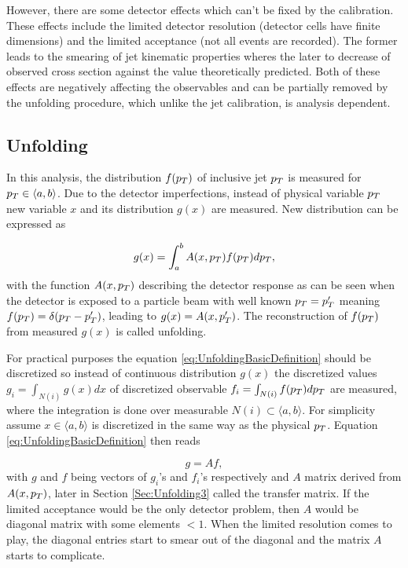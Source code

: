 However, there are some detector effects which can't be fixed by the calibration. These
effects include the limited detector resolution (detector cells have finite
dimensions) and the limited acceptance (not all events are recorded). The former
leads to the smearing of jet kinematic properties wheres the later to
decrease of observed cross section against the value theoretically
predicted. Both of these effects are negatively affecting the observables
and can be partially removed by the unfolding procedure, which unlike
the jet calibration, is analysis dependent. 

\subsection{Unfolding}

In this analysis, the distribution $f(p_{T})$ of inclusive jet $p_{T}$ is measured
for $p_{T} \in \langle a, b \rangle$. Due to the detector imperfections,
instead of physical variable $p_{T}$ new variable $x$ and its distribution
$g(x)$ are measured. New distribution can be expressed as

\begin{equation}
  g(x) = \int_a^b A(x, p_{T}) f(p_{T}) dp_{T},
  \label{eq:UnfoldingBasicDefinition}
\end{equation}
with the function $A(x, p_{T})$ describing the detector response as can be seen
when the detector is exposed to a particle beam with well known $p_{T} = p_{T}'$
meaning $f(p_{T}) = \delta(p_{T} - p_{T}')$, leading to $g(x) = A(x, p_{T}')$. The
reconstruction of $f(p_{T})$ from measured $g(x)$ is called unfolding.

For practical purposes the equation \eqref{eq:UnfoldingBasicDefinition} should
be discretized so instead of continuous distribution $g(x)$ the discretized
values $g_i = \int_{N(i)} g(x)dx$ of discretized observable $f_i =
\int_{N(i)} f(p_{T})dp_{T}$ are measured, where the integration is done over
measurable $N(i) \subset \langle a, b \rangle$. For simplicity assume $x \in
\langle a, b \rangle$ is discretized in the same way as the physical $p_{T}$.
Equation \eqref{eq:UnfoldingBasicDefinition} then reads

\begin{equation}
  g = Af,
  \label{eq:UnfoldingDiscretized}
\end{equation}
with $g$ and $f$ being vectors of $g_i$'s and $f_i$'s respectively and $A$
matrix derived from $A(x, p_{T})$, later in Section \ref{Sec:Unfolding3} called
the transfer matrix. If the limited acceptance would be the only detector
problem, then $A$ would be diagonal matrix with some elements $ < 1$. When the
limited resolution comes to play, the diagonal entries start to smear out of
the diagonal and the matrix $A$ starts to complicate.

